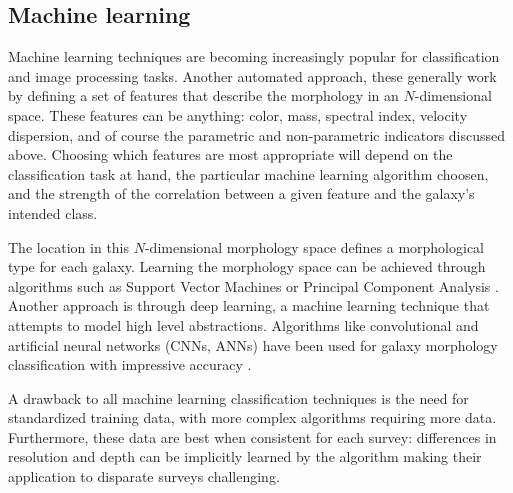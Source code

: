 

\subsection{Machine learning}
Machine learning techniques are becoming increasingly popular for classification and image processing tasks. Another automated approach, these generally work by defining a set of features that describe the morphology in an $N$-dimensional space. These features can be anything: color, mass, spectral index, velocity dispersion, and of course the parametric and non-parametric indicators discussed above. Choosing which features are most appropriate will depend on the classification task at hand, the particular machine learning algorithm choosen, and the strength of the correlation between a given feature and the galaxy's intended class. 

The location in this $N$-dimensional morphology space defines a morphological type for each galaxy. Learning the morphology space can be achieved through algorithms such as Support Vector Machines \citep{HuertasCompany2008} or Principal Component Analysis \citep{Watanabe1985, Conselice2006, Scarlata2007, Peth2016}. Another approach is through deep learning, a machine learning technique that attempts to model high level abstractions. Algorithms like convolutional and artificial neural networks (CNNs, ANNs) have been used for galaxy morphology classification with impressive accuracy \citep{Ball2004, 	Banerji2010, Dieleman2015, HuertasCompany2015,DominguezSanchez2017}. 

A drawback to all machine learning classification techniques is the need for standardized training data, with more complex algorithms requiring more data. Furthermore, these data are best when consistent for each survey: differences in resolution and depth can be implicitly learned by the algorithm making their application to disparate surveys challenging. 


